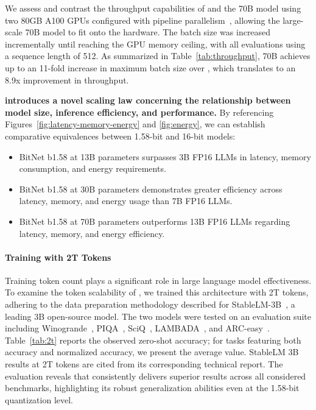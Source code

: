 We assess and contrast the throughput capabilities of  and the  70B model using two 80GB A100 GPUs configured with pipeline parallelism~\cite{gpipe}, allowing the large-scale  70B model to fit onto the hardware. The batch size was increased incrementally until reaching the GPU memory ceiling, with all evaluations using a sequence length of 512. As summarized in Table~\ref{tab:throughput},  70B achieves up to an 11-fold increase in maximum batch size over , which translates to an 8.9x improvement in throughput.

\textbf{ introduces a novel scaling law concerning the relationship between model size, inference efficiency, and performance.} By referencing Figures~\ref{fig:latency-memory-energy} and \ref{fig:energy}, we can establish comparative equivalences between 1.58-bit and 16-bit models:

\begin{itemize}
    \item BitNet b1.58 at 13B parameters surpasses 3B FP16 LLMs in latency, memory consumption, and energy requirements.
    \item BitNet b1.58 at 30B parameters demonstrates greater efficiency across latency, memory, and energy usage than 7B FP16 LLMs.
    \item BitNet b1.58 at 70B parameters outperforms 13B FP16 LLMs regarding latency, memory, and energy efficiency.
\end{itemize}

\paragraph{Training with 2T Tokens}

Training token count plays a significant role in large language model effectiveness. To examine the token scalability of , we trained this architecture with 2T tokens, adhering to the data preparation methodology described for StableLM-3B~\cite{StableLM-3B-4E1T}, a leading 3B open-source model. The two models were tested on an evaluation suite including Winogrande~\cite{winoGrande}, PIQA~\cite{piqa}, SciQ~\cite{sciq}, LAMBADA~\cite{lambada}, and ARC-easy~\cite{arc}. Table~\ref{tab:2t} reports the observed zero-shot accuracy; for tasks featuring both accuracy and normalized accuracy, we present the average value. StableLM 3B results at 2T tokens are cited from its corresponding technical report. The evaluation reveals that  consistently delivers superior results across all considered benchmarks, highlighting its robust generalization abilities even at the 1.58-bit quantization level.

